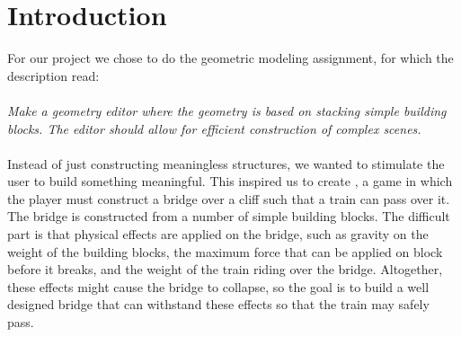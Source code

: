 \section{Introduction}
For our project we chose to do the geometric modeling assignment, for which the description read:\\
\\
\textit{Make a geometry editor where the geometry is based on stacking simple building blocks. The editor should allow for efficient construction of complex scenes.}\\
\\
Instead of just constructing meaningless structures, we wanted to stimulate the user to build something meaningful. This inspired us to create \name, a game in which the player must construct a bridge over a cliff such that a train can pass over it. The bridge is constructed from a number of simple building blocks. The difficult part is that physical effects are applied on the bridge, such as gravity on the weight of the building blocks, the maximum force that can be applied on  block before it breaks, and the weight of the train riding over the bridge. Altogether, these effects might cause the bridge to collapse, so the goal is to build a well designed bridge that can withstand these effects so that the train may safely pass.
